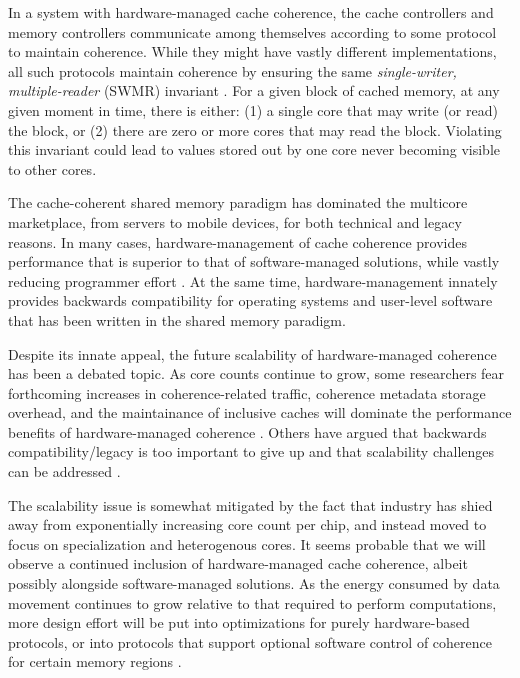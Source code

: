 In a system with hardware-managed cache coherence, the cache controllers and memory controllers
communicate among themselves according to some protocol to maintain coherence.
While they might have vastly different implementations, 
all such protocols maintain coherence by ensuring the same {\em single-writer, multiple-reader} (SWMR) invariant \cite{sorin2011primer}. 
For a given block of cached memory, at any given moment in time, there is either: 
(1) a single core that may write (or read) the block, or 
(2) there are zero or more cores that may read the block.
Violating this invariant could lead to values stored out by one core never becoming visible to other cores.

The cache-coherent shared memory paradigm has dominated the multicore marketplace, from servers to mobile devices,
for both technical and legacy reasons.
In many cases, hardware-management of cache coherence provides performance that is superior
to that of software-managed solutions, while vastly reducing programmer effort \cite{leverich-isca07}.
At the same time, hardware-management innately provides backwards compatibility for operating systems and user-level software that has been written in the shared memory paradigm.

Despite its innate appeal, the future scalability of hardware-managed coherence has been a debated topic.
As core counts continue to grow, some researchers fear forthcoming increases in coherence-related traffic, coherence metadata storage overhead, and the maintainance of inclusive caches will dominate the performance benefits of hardware-managed coherence \cite{choi2011denovo, kelm2011cohesion, howard201048}.
Others have argued that backwards compatibility/legacy is too important to give up and that scalability challenges can be addressed \cite{martin2012chip}.

The scalability issue is somewhat mitigated by the fact that industry has shied away from exponentially increasing core count per chip, and instead moved to focus on specialization and heterogenous cores.
It seems probable that we will observe a continued inclusion of hardware-managed cache coherence, albeit possibly alongside software-managed solutions.
As the energy consumed by data movement continues to grow relative to that required to perform computations, more design effort will be put into optimizations for purely hardware-based protocols,
or into protocols that support optional software control of coherence for certain memory regions \cite{kelm2011cohesion}.

